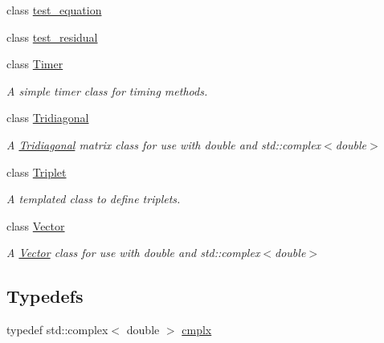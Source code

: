 \begin{DoxyCompactItemize}
class \hyperlink{classLuna_1_1test__equation}{test\+\_\+equation}
\item 
class \hyperlink{classLuna_1_1test__residual}{test\+\_\+residual}
\item 
class \hyperlink{classLuna_1_1Timer}{Timer}
\begin{DoxyCompactList}\small\item\em A simple timer class for timing methods. \end{DoxyCompactList}\item 
class \hyperlink{classLuna_1_1Tridiagonal}{Tridiagonal}
\begin{DoxyCompactList}\small\item\em A \hyperlink{classLuna_1_1Tridiagonal}{Tridiagonal} matrix class for use with double and std\+::complex$<$double$>$ \end{DoxyCompactList}\item 
class \hyperlink{classLuna_1_1Triplet}{Triplet}
\begin{DoxyCompactList}\small\item\em A templated class to define triplets. \end{DoxyCompactList}\item 
class \hyperlink{classLuna_1_1Vector}{Vector}
\begin{DoxyCompactList}\small\item\em A \hyperlink{classLuna_1_1Vector}{Vector} class for use with double and std\+::complex$<$double$>$ \end{DoxyCompactList}\end{DoxyCompactItemize}
\subsection*{Typedefs}
\begin{DoxyCompactItemize}
\item 
typedef std\+::complex$<$ double $>$ \hyperlink{namespaceLuna_af3257e90072a78a8ffb16a16773aa18e}{cmplx}
\end{DoxyCompactItemize}
